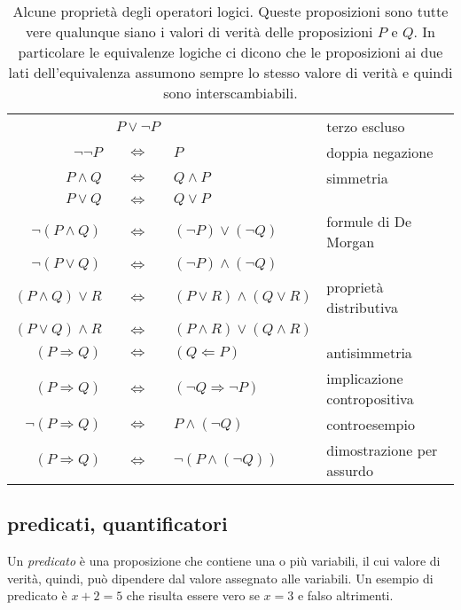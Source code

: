 \begin{table}
\begin{tabular}{rcll}
                         &$P \lor \neg P$&                                       &terzo escluso \\
                         $\neg \neg P$ & $\iff$ & $ P$                           & doppia negazione\\
                                    $P \land Q$ & $\iff$ & $ Q \land P$                   & simmetria\\
                                     $P \lor Q$ & $\iff$ & $ Q \lor P$                    & \\
                              $\neg (P\land Q)$ & $\iff$ & $ (\neg P) \lor (\neg Q)$      & formule di De Morgan\\
                               $\neg (P\lor Q)$ & $\iff$ & $ (\neg P) \land (\neg Q)$     & \\
                            $(P\land Q) \lor R$ & $\iff$ & $ (P\lor R) \land (Q \lor R)$  & proprietà distributiva\\
                            $(P\lor Q) \land R$ & $\iff$ & $ (P\land R) \lor (Q \land R)$ & \\
                            $(P \Rightarrow Q)$ & $\iff$ & $ (Q \Leftarrow P)$            & antisimmetria\\
                            $(P\Rightarrow Q)$ & $\iff$ & $ (\neg Q\Rightarrow\neg P)$   & implicazione contropositiva\\
                        $\neg (P\Rightarrow Q)$ & $\iff$ & $ P \land (\neg Q)$            & controesempio\\
                             $(P\Rightarrow Q)$ & $\iff$ & $ \lnot(P \land (\neg Q))$     & dimostrazione per assurdo
\end{tabular}
\caption{Alcune proprietà degli operatori logici. Queste proposizioni sono tutte vere qualunque siano i valori di verità delle proposizioni $P$ e $Q$. In particolare le equivalenze logiche ci dicono che le proposizioni ai due lati dell'equivalenza assumono sempre lo stesso valore di verità e quindi sono interscambiabili.}
\label{tab:operatori_logici}
\end{table}

\subsection{predicati, quantificatori}

Un \emph{predicato}%
%
 è una proposizione che contiene
una o più variabili, il cui valore di verità, quindi,
può dipendere dal valore assegnato alle variabili.
Un esempio di predicato è $x+2=5$ che risulta essere vero se $x=3$
e falso altrimenti.


